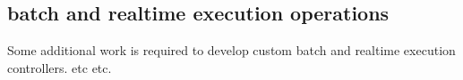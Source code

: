 \subsection{batch and realtime execution operations}
\label{sec:advanced}

Some additional work is required to develop custom batch and realtime execution controllers.
etc etc.




